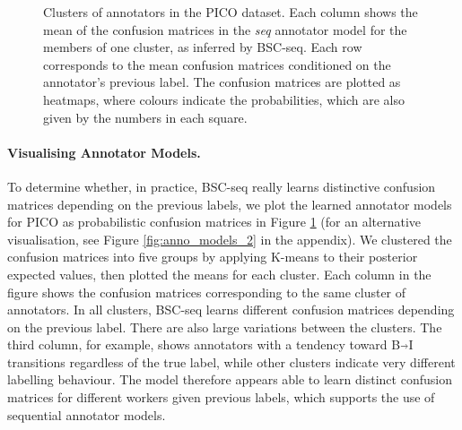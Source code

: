 \begin{figure}[h]
\caption{Clusters of annotators in the PICO dataset. Each column shows the mean of the confusion matrices in the 
\textit{seq} annotator model for the members of one cluster, as inferred by BSC-seq.
 Each row corresponds to the mean confusion matrices conditioned on the annotator's previous label. 
 The confusion matrices are plotted as heatmaps,
where colours indicate the probabilities, which are also given by the numbers in each square.
}
\label{fig:conf_mat_clusters}
\end{figure}
\paragraph{Visualising Annotator Models. }
To determine whether, in practice, BSC-seq really learns distinctive confusion matrices depending on the previous labels,
we plot the learned annotator models for
PICO as probabilistic confusion matrices in Figure \ref{fig:conf_mat_clusters} (for an alternative visualisation, 
see Figure \ref{fig:anno_models_2} in the appendix).
We clustered 
the confusion matrices %
into five groups by applying K-means to their posterior expected values,
then plotted the means for each cluster.
Each column in the figure shows the confusion matrices corresponding to the same cluster of annotators. 
In all clusters, BSC-seq learns different 
confusion matrices depending on the previous label.
There are also large variations between the clusters.
The third column, for example, shows
annotators with a tendency toward B$\Arrow{0.2cm}$I transitions regardless of the true label, while other clusters 
indicate very different labelling behaviour. The model therefore appears able to learn
distinct confusion matrices for different workers given previous labels, 
which supports the use of sequential
annotator models.

